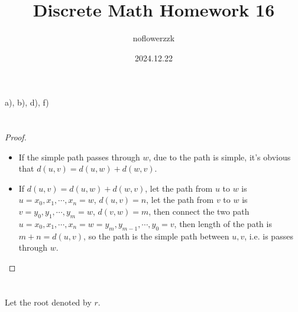 \documentclass{article}
\title{Discrete Math Homework 16}
\author{noflowerzzk}
\date{2024.12.22}
\begin{document}
\maketitle

\section{}

a), b), d), f)

\section{}

\begin{proof} \quad
    \begin{itemize}
        \item If the simple path passes through $w$, due to the path is simple, it's obvious that $d(u, v) = d(u, w) + d(w, v)$.
        \item If $d(u, v) = d(u, w) + d(w, v)$, let the path from $u$ to $w$ is $u = x_0, x_1, \cdots, x_n = w$, $d(u, v) = n$, let the path from $v$ to $w$ is $v = y_0, y_1, \cdots, y_m = w$, $d(v, w) = m$, then connect the two path $u = x_0, x_1, \cdots, x_n = w = y_m, y_{m - 1}, \cdots, y_0 = v$, then length of the path is $m + n = d(u, v)$, so the path is the simple path between $u, v$, i.e. is passes through $w$.
    \end{itemize}
\end{proof}

\section{}

Let the root denoted by $r$.
\end{document}
